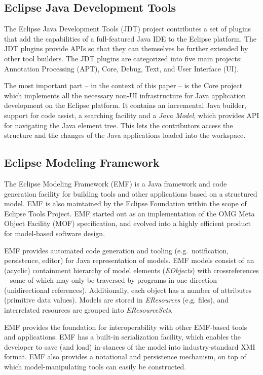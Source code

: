 \subsection{Eclipse Java Development Tools~\cite{JDT}}
The Eclipse Java Development Tools (JDT) project contributes a set of
plugins that add the capabilities of a full-featured Java IDE to the Eclipse
platform. The JDT plugins provide APIs so that they can themselves be further
extended by other tool builders. The JDT plugins are categorized into five main
projects: Annotation Processing (APT), Core, Debug, Text, and User Interface
(UI).

The most important part -- in the context of this paper -- is the Core project
which implements all the necessary non-UI infrastructure for Java application
development on the Eclipse platform. It contains an incremental Java builder,
support for code assist, a searching facility and a \emph{Java Model}, which
provides API for navigating the Java element tree. This lets the contributors
access the structure and the changes of the Java applications loaded into the
workspace.

\subsection{Eclipse Modeling Framework~\cite{EMF}}
The Eclipse Modeling Framework (EMF) is a Java framework and code
generation facility for building tools and other applications based on a
structured model. EMF is also maintained by the Eclipse Foundation within the
scope of Eclipse Tools Project. EMF started out as an implementation of the OMG
Meta Object Facility (MOF) specification, and evolved into a highly efficient
product for model-based software design.

EMF provides automated code generation and tooling (e.g.~notification,
persistence, editor) for Java representation of models. EMF models consist of an
(acyclic) containment hierarchy of model elements (\emph{EObjects}) with
crossreferences -- some of which may only be traversed by programs in one
direction (unidirectional references). Additionally, each object has a number of
attributes (primitive data values). Models are stored in \emph{EResources} (e.g.
files), and interrelated resources are grouped into \emph{EResourceSets}.

EMF provides the foundation for interoperability with other EMF-based tools and
applications. EMF has a built-in serialization facility, which enables the developer to save
(and load) in-stances of the model into industry-standard XMI format. EMF also
provides a notational and persistence mechanism, on top of which
model-manipulating tools can easily be constructed.

